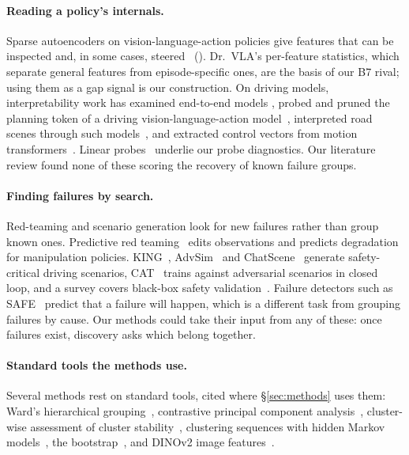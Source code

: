 \paragraph{Reading a policy's internals.}
Sparse autoencoders on vision-language-action policies give features that can be
inspected and, in some cases, steered~\cite{swann2026sparse,jin2026eventsae}
(). Dr.~VLA's per-feature
statistics, which separate general features from episode-specific ones, are the
basis of our B7 rival; using them as a gap signal is our construction. On driving
models, interpretability work has examined end-to-end models
\cite{motzkus2026driving}, probed and pruned the planning token of a driving
vision-language-action model~\cite{babu2026depthwise}, interpreted road scenes
through such models~\cite{panda2026whatdotheysee}, and extracted control vectors
from motion transformers~\cite{tas2025words}. Linear probes~\cite{alain2016probes}
underlie our probe diagnostics. Our literature review found none of these
scoring the recovery of known failure groups.

\paragraph{Finding failures by search.}
Red-teaming and scenario generation look for new failures rather than group
known ones. Predictive red teaming~\cite{roboart2025} edits observations and
predicts degradation for manipulation policies. KING~\cite{hanselmann2022king},
AdvSim~\cite{wang2021advsim} and ChatScene~\cite{zhang2024chatscene} generate
safety-critical driving scenarios, CAT~\cite{zhang2023cat} trains against
adversarial scenarios in closed loop,
and a survey covers black-box safety validation~\cite{corso2021survey}. Failure
detectors such as SAFE~\cite{safe2025} predict that a failure will happen, which
is a different task from grouping failures by cause. Our methods could take
their input from any of these: once failures exist, discovery asks which belong
together.

\paragraph{Standard tools the methods use.}
Several methods rest on standard tools, cited where \S\ref{sec:methods} uses
them: Ward's hierarchical grouping~\cite{ward1963hierarchical}, contrastive
principal component analysis~\cite{abid2018cpca}, cluster-wise assessment of
cluster stability~\cite{hennig2007stability}, clustering sequences with hidden
Markov models~\cite{smyth1996hmm}, the bootstrap~\cite{efron1979bootstrap}, and
DINOv2 image features~\cite{oquab2024dinov2}.
